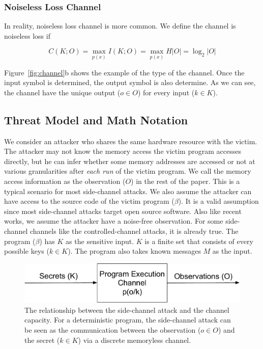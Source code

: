 \subsubsection{Noiseless Loss Channel}
In reality, noiseless loss channel is more common. We define the channel is noiseless loss if

\begin{equation} \label{eq:2}
    C(K;O) = \max_{p(x)} I(K;O) = \max_{p(x)} H |O| = \log_2 {|O|}
\end{equation}

Figure~\ref{fig:channel}b  shows the example of the type of the channel. Once the input symbol is determined, the output symbol is also determine. As we can see, the channel have the unique output ($o \in O$) for every input ($k \in K$).



\subsection{Threat Model and Math Notation}


We consider an attacker who shares the same hardware resource with the victim. The attacker may not know the memory access the victim program accesses directly, but he can infer whether some memory addresses are accessed or not at various granularities after \textit{each run} of the victim program. We call the memory access information as the observation ($O$) in the rest of the paper. This is a typical scenario for most side-channel attacks.  We also assume the attacker can have access to the source code of the victim program ($\beta$). It is a valid assumption since most side-channel attacks target open source software. Also like recent works, we assume the attacker have a noise-free observation. For some side-channel channels like the controlled-channel attacks, it is already true. The program ($\beta$) has $K$ as the sensitive input. $K$ is a finite set that consists of every possible keys ($k \in K$). The program also takes known messages $M$ as the input. 

\begin{figure}[ht]
    \centering
    \includegraphics[width=\columnwidth]{./figures/chapter5/channel.pdf}
    \caption{The relationship between the side-channel attack and the channel capacity. For a deterministic program, the side-channel attack can be seen as the communication between the observation ($o \in O$) and the secret ($k \in K$) via a discrete memoryless channel.}
    \label{fig:side_channel}
\end{figure}

